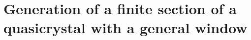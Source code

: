 \documentclass[text.tex]{subfiles}
\begin{document}
\section{Generation of a finite section of a quasicrystal with a general window}
\end{document}
